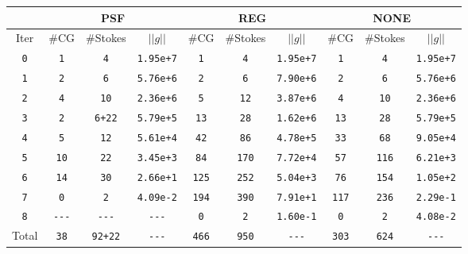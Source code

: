 \begin{table}[H]
\begin{center}
    \begingroup
    \setlength{\tabcolsep}{8pt}
    \renewcommand{\arraystretch}{1.25}
    \begin{tabular}{c| c c c | c c c | c c c}
        &  \multicolumn{3}{|c|}{PSF} & \multicolumn{3}{|c|}{REG} & \multicolumn{3}{|c}{NONE} \\
        \hline
        Iter & 
        \#CG & \#Stokes & $||g||$ & 
        \#CG & \#Stokes & $||g||$ & 
        \#CG & \#Stokes & $||g||$ \\
        \verb~0~ &
        \verb~1~ & \verb~4~ & \verb~1.95e+7~ &
        \verb~1~ & \verb~4~ & \verb~1.95e+7~ &
        \verb~1~ & \verb~4~ & \verb~1.95e+7~ \\
        \verb~1~ &
        \verb~2~ & \verb~6~ & \verb~5.76e+6~ &
        \verb~2~ & \verb~6~ & \verb~7.90e+6~ &
        \verb~2~ & \verb~6~ & \verb~5.76e+6~ \\
        \verb~2~ &
        \verb~4~ & \verb~10~ & \verb~2.36e+6~ &
        \verb~5~ & \verb~12~ & \verb~3.87e+6~ &
        \verb~4~ & \verb~10~ & \verb~2.36e+6~ \\
        \verb~3~ &
        \verb~2~ & \verb~6+22~ & \verb~5.79e+5~ &
        \verb~13~ & \verb~28~ & \verb~1.62e+6~ &
        \verb~13~ & \verb~28~ & \verb~5.79e+5~ \\
        \verb~4~ &
        \verb~5~ & \verb~12~ & \verb~5.61e+4~ &
        \verb~42~ & \verb~86~ & \verb~4.78e+5~ &
        \verb~33~ & \verb~68~ & \verb~9.05e+4~ \\
        \verb~5~ &
        \verb~10~ & \verb~22~ & \verb~3.45e+3~ &
        \verb~84~ & \verb~170~ & \verb~7.72e+4~ &
        \verb~57~ & \verb~116~ & \verb~6.21e+3~ \\
        \verb~6~ &
        \verb~14~ & \verb~30~ & \verb~2.66e+1~ &
        \verb~125~ & \verb~252~ & \verb~5.04e+3~ &
        \verb~76~ & \verb~154~ & \verb~1.05e+2~ \\
        \verb~7~ &
        \verb~0~ & \verb~2~ & \verb~4.09e-2~ &
        \verb~194~ & \verb~390~ & \verb~7.91e+1~ &
        \verb~117~ & \verb~236~ & \verb~2.29e-1~ \\
        \verb~8~ & 
        \verb~---~ & \verb~---~ & \verb~---~ &
        \verb~0~ & \verb~2~ & \verb~1.60e-1~ &
        \verb~0~ & \verb~2~ & \verb~4.08e-2~ \\
        \hline
        Total & 
        \verb~38~ & \verb~92+22~ & \verb~---~ &
        \verb~466~ & \verb~950~ & \verb~---~ &
        \verb~303~ & \verb~624~ & \verb~---~ \\
    \end{tabular}
    \endgroup
\end{center}
\end{table}
